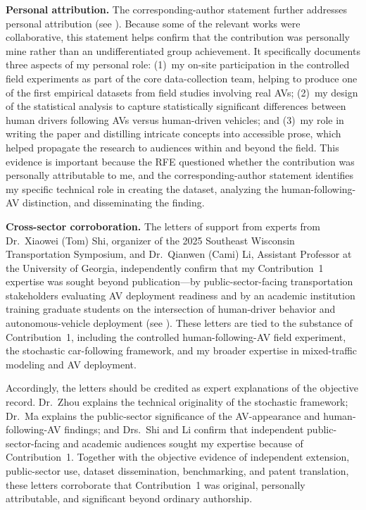 \documentclass[11pt,letterpaper]{article}
\begin{document}
\textbf{Personal attribution.} The corresponding-author statement further addresses personal attribution (see ). Because some of the relevant works were collaborative, this statement helps confirm that the contribution was personally mine rather than an undifferentiated group achievement. It specifically documents three aspects of my personal role: (1)~my on-site participation in the controlled field experiments as part of the core data-collection team, helping to produce one of the first empirical datasets from field studies involving real AVs; (2)~my design of the statistical analysis to capture statistically significant differences between human drivers following AVs versus human-driven vehicles; and (3)~my role in writing the paper and distilling intricate concepts into accessible prose, which helped propagate the research to audiences within and beyond the field. This evidence is important because the RFE questioned whether the contribution was personally attributable to me, and the corresponding-author statement identifies my specific technical role in creating the dataset, analyzing the human-following-AV distinction, and disseminating the finding.

\textbf{Cross-sector corroboration.} The letters of support from experts from Dr.~Xiaowei (Tom) Shi, organizer of the 2025 Southeast Wisconsin Transportation Symposium, and Dr.~Qianwen (Cami) Li, Assistant Professor at the University of Georgia, independently confirm that my Contribution~1 expertise was sought beyond publication---by public-sector-facing transportation stakeholders evaluating AV deployment readiness and by an academic institution training graduate students on the intersection of human-driver behavior and autonomous-vehicle deployment (see ). These letters are tied to the substance of Contribution~1, including the controlled human-following-AV field experiment, the stochastic car-following framework, and my broader expertise in mixed-traffic modeling and AV deployment.

Accordingly, the letters should be credited as expert explanations of the objective record. Dr.~Zhou explains the technical originality of the stochastic framework; Dr.~Ma explains the public-sector significance of the AV-appearance and human-following-AV findings; and Drs.~Shi and Li confirm that independent public-sector-facing and academic audiences sought my expertise because of Contribution~1. Together with the objective evidence of independent extension, public-sector use, dataset dissemination, benchmarking, and patent translation, these letters corroborate that Contribution~1 was original, personally attributable, and significant beyond ordinary authorship.
\end{document}
